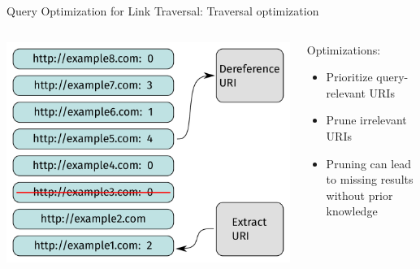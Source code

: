 \begin{frame}{Query Optimization for Link Traversal: Traversal optimization}
    \begin{columns}[T] %
        \begin{column}{0.6\textwidth} %
            \includegraphics[width=.80\linewidth]{images/link-queue-optimized.pdf} %
        \end{column}

        \begin{column}{0.4\textwidth}
            Optimizations:
            \begin{itemize}
                \item Prioritize query-relevant URIs
                \item Prune irrelevant URIs
                \item Pruning can lead to missing results without prior knowledge
            \end{itemize}
        \end{column}
    \end{columns}
\end{frame}

